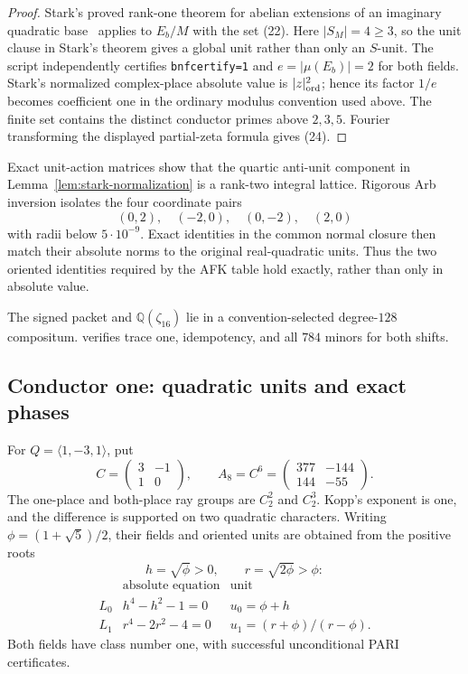 \documentclass[11pt]{article}
\newcommand{\Q}{\mathbb Q}
\begin{document}
\begin{proof}
Stark's proved rank-one theorem for abelian extensions of an imaginary
quadratic base~\cite{Stark1980} applies to $E_b/M$ with the set
\textup{(22)}. Here $|S_M|=4\ge3$, so the unit clause in Stark's
theorem gives a global unit rather than only an $S$-unit. The script
 independently
certifies \texttt{bnfcertify=1} and
$e=|\mu(E_b)|=2$ for both fields. Stark's normalized complex-place absolute value is
$|z|_{\rm ord}^2$; hence its factor $1/e$ becomes coefficient one in
the ordinary modulus convention used above.
The finite set contains the distinct conductor primes above $2,3,5$.
Fourier transforming the displayed partial-zeta formula gives
\textup{(24)}.
\end{proof}

Exact unit-action matrices show that the quartic anti-unit component
in Lemma~\ref{lem:stark-normalization} is a rank-two integral lattice.
Rigorous Arb inversion isolates the four coordinate pairs
\[
 (0,2),\quad(-2,0),\quad(0,-2),\quad(2,0)
\tag{25}
\]
with radii below $5\cdot10^{-9}$.  Exact identities in the common
normal closure then match their absolute norms to the original
real-quadratic units.  Thus the two oriented identities required by
the AFK table hold exactly, rather than only in absolute value.

The signed packet and $\Q(\zeta_{16})$ lie in a
convention-selected degree-$128$ compositum.
 verifies trace one,
idempotency, and all $784$ minors for both shifts.

\subsection{Conductor one: quadratic units and exact phases}

For $Q=\langle1,-3,1\rangle$, put
\[
 C=\begin{pmatrix}3&-1\\1&0\end{pmatrix},\qquad
 A_8=C^6=\begin{pmatrix}377&-144\\144&-55\end{pmatrix}.
\tag{26}
\]
The one-place and both-place ray groups are $C_2^2$ and $C_2^3$.
Kopp's exponent is one, and the difference is supported on two
quadratic characters.  Writing $\phi=(1+\sqrt5)/2$, their fields and
oriented units are obtained from the positive roots
\[
 h=\sqrt\phi>0,\qquad r=\sqrt{2\phi}>\phi:
\]
\[
\begin{array}{c|c|c}
 &\text{absolute equation}&\text{unit}\\ \hline
L_0&h^4-h^2-1=0&u_0=\phi+h\\
L_1&r^4-2r^2-4=0&u_1=(r+\phi)/(r-\phi).
\end{array}
\tag{27}
\]
Both fields have class number one, with successful unconditional PARI
certificates.
\end{document}
